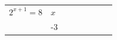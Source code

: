 {        \begin{center}
      
      \label{m39253*id154969}
      
    \noindent
      \tablelasttail{}
      \begin{xtabular*}{\mytablewidth}[t]{|p{10\mystarwidth}|p{10\mystarwidth}|p{10\mystarwidth}|p{10\mystarwidth}|p{10\mystarwidth}|p{10\mystarwidth}|p{10\mystarwidth}|p{10\mystarwidth}|}\hline
    
    
        
                \begin{math}{2}^{x+1}=8\end{math}
               &
     \tabularnewline{}
    
    
         &
    
    
        -3 &
    
    

\end{xtabular*}
\end{center}}

